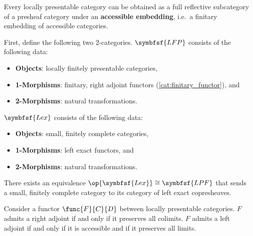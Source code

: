     \begin{property}
        Every locally presentable category can be obtained as a full reflective subcategory of a presheaf category under an \textbf{accessible embedding}, i.e.~a finitary embedding of accessible categories.
    \end{property}
    \begin{property}
        First, define the following two 2-categories. $\symbfsf{LFP}$ consists of the following data:
        \begin{itemize}
            \item\textbf{Objects}: locally finitely presentable categories,
            \item\textbf{1-Morphisms}: finitary, right adjoint functors (\cref{cat:finitary_functor}), and
            \item\textbf{2-Morphisms}: natural transformations.
        \end{itemize}
        $\symbfsf{Lex}$ consists of the following data:
        \begin{itemize}
            \item\textbf{Objects}: small, finitely complete categories,
            \item\textbf{1-Morphisms}: left exact functors, and
            \item\textbf{2-Morphisms}: natural transformations.
        \end{itemize}
        There exists an equivalence $\op{\symbfsf{Lex}}\cong\symbfsf{LPF}$ that sends a small, finitely complete category to its category of left exact copresheaves.
    \end{property}

    \begin{theorem}\label{cat:adjoint_functor_theorem}
        Consider a functor $\func{F}{C}{D}$ between locally presentable categories. $F$ admits a right adjoint if and only if it preserves all colimits. $F$ admits a left adjoint if and only if it is accessible and if it preserves all limits.
    \end{theorem}

